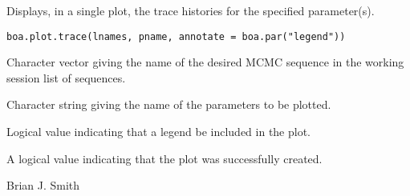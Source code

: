 \begin{Description}\relax
Displays, in a single plot, the trace histories for the specified parameter(s).
\end{Description}
\begin{Usage}
\begin{verbatim}
boa.plot.trace(lnames, pname, annotate = boa.par("legend"))
\end{verbatim}
\end{Usage}
\begin{Arguments}
\begin{ldescription}
\item[\code{lnames}] Character vector giving the name of the desired MCMC sequence 
in the working session list of sequences.
\item[\code{pname}] Character string giving the name of the parameters to be plotted.
\item[\code{annotate}] Logical value indicating that a legend be included in the plot.
\end{ldescription}
\end{Arguments}
\begin{Value}
A logical value indicating that the plot was successfully created.
\end{Value}
\begin{Author}\relax
Brian J. Smith
\end{Author}
\begin{SeeAlso}\relax
{}
\end{SeeAlso}

